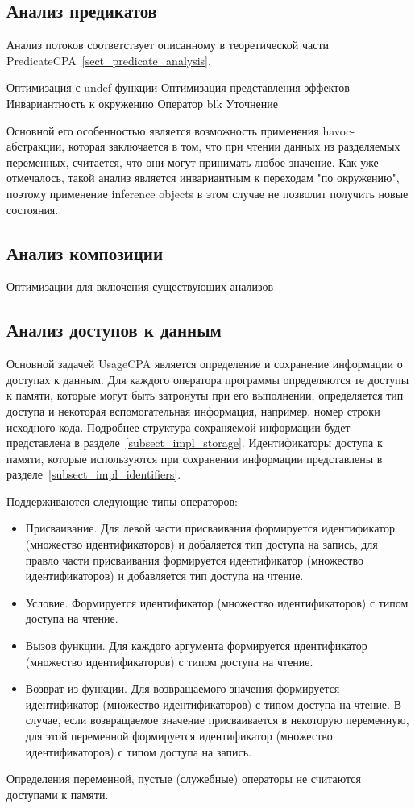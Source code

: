 \subsection{Анализ предикатов}
Анализ потоков соответствует описанному в теоретической части PredicateCPA~\ref{sect_predicate_analysis}.


Оптимизация с undef функции
Оптимизация представления эффектов
Инвариантность к окружению
Оператор blk
Уточнение

Основной его особенностью является возможность применения havoc-абстракции, которая заключается в том, что при чтении данных из разделяемых переменных, считается, что они могут принимать любое значение.
Как уже отмечалось, такой анализ является инвариантным к переходам "по окружению", поэтому применение inference objects в этом случае не позволит получить новые состояния.

\subsection{Анализ композиции}
Оптимизации для включения существующих анализов

\subsection{Анализ доступов к данным}
Основной задачей UsageCPA является определение и сохранение информации о доступах к данным. 
Для каждого оператора программы определяются те доступы к памяти, которые могут быть затронуты при его выполнении, определяется тип доступа и некоторая вспомогательная информация, например, номер строки исходного кода.
Подробнее структура сохраняемой информации будет представлена в разделе~\ref{subsect_impl_storage}.
Идентификаторы доступа к памяти, которые используются при сохранении информации представлены в разделе~\ref{subsect_impl_identifiers}.

Поддерживаются следующие типы операторов:
\begin{itemize}
\item Присваивание. Для левой части присваивания формируется идентификатор (множество идентификаторов) и добаляется тип доступа на запись, для правло части присваивания формируется идентификатор (множество идентификаторов) и добавляется тип доступа на чтение.
\item Условие. Формируется идентификатор (множество идентификаторов) с типом доступа на чтение.
\item Вызов функции. Для каждого аргумента формируется идентификатор (множество идентификаторов) с типом доступа на чтение.
\item Возврат из функции. Для возвращаемого значения формируется идентификатор (множество идентификаторов) с типом доступа на чтение. В случае, если возвращаемое значение присваивается в некоторую переменную, для этой переменной формируется идентификатор (множество идентификаторов) с типом доступа на запись.
\end{itemize}
Определения переменной, пустые (служебные) операторы не считаются доступами к памяти.

